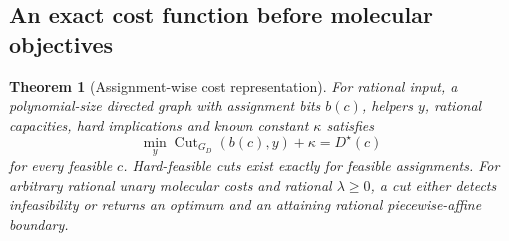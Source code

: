 \documentclass[10pt,letterpaper]{article}
\newtheorem{theorem}{Theorem}
\begin{document}
\subsection{An exact cost function before molecular objectives}
\begin{samepage}
\begin{theorem}[Assignment-wise cost representation]\label{thm:cost}
For rational input, a polynomial-size directed graph with assignment bits $b(c)$, helpers $y$, rational capacities, hard implications and known constant $\kappa$ satisfies
\begin{equation}
\min_y\operatorname{Cut}_{G_D}(b(c),y)+\kappa=D^\star(c)\label{eq:identity}
\end{equation}
for every feasible $c$. Hard-feasible cuts exist exactly for feasible assignments. For arbitrary rational unary molecular costs and rational $\lambda\ge0$, a cut either detects infeasibility or returns an optimum and an attaining rational piecewise-affine boundary.
\end{theorem}
\end{samepage}
\end{document}
